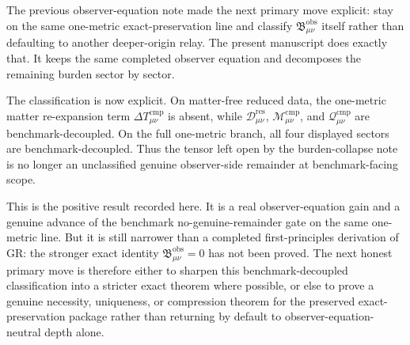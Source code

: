 \documentclass[11pt]{article}
\newcommand{\ResidualDec}{\mathcal D_{\mu\nu}^{\mathrm{res}}}
\newcommand{\CompMix}{\mathcal M_{\mu\nu}^{\mathrm{cmp}}}
\newcommand{\CompQuad}{\mathcal Q_{\mu\nu}^{\mathrm{cmp}}}
\newcommand{\DeltaTComp}{\Delta T_{\mu\nu}^{\mathrm{cmp}}}
\newcommand{\ObsBurden}{\mathfrak B_{\mu\nu}^{\mathrm{obs}}}
\begin{document}
The previous observer-equation note made the next primary move explicit: stay on the same one-metric exact-preservation line and classify \(\ObsBurden\) itself rather than defaulting to another deeper-origin relay. The present manuscript does exactly that. It keeps the same completed observer equation and decomposes the remaining burden sector by sector.

The classification is now explicit. On matter-free reduced data, the one-metric matter re-expansion term \(\DeltaTComp\) is absent, while \(\ResidualDec\), \(\CompMix\), and \(\CompQuad\) are benchmark-decoupled. On the full one-metric branch, all four displayed sectors are benchmark-decoupled. Thus the tensor left open by the burden-collapse note is no longer an unclassified genuine observer-side remainder at benchmark-facing scope.

This is the positive result recorded here. It is a real observer-equation gain and a genuine advance of the benchmark no-genuine-remainder gate on the same one-metric line. But it is still narrower than a completed first-principles derivation of GR: the stronger exact identity \(\ObsBurden=0\) has not been proved. The next honest primary move is therefore either to sharpen this benchmark-decoupled classification into a stricter exact theorem where possible, or else to prove a genuine necessity, uniqueness, or compression theorem for the preserved exact-preservation package rather than returning by default to observer-equation-neutral depth alone.
\end{document}
